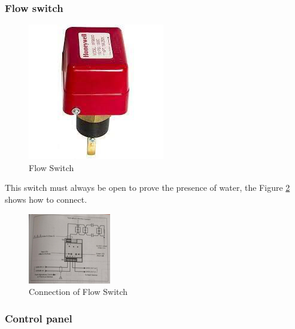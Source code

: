 \documentclass[12pt,fleqn]{book} %
\begin{document}
    \subsubsection{Flow switch}
    \begin{figure}[!h]
    \centering
    \includegraphics[width=0.5\linewidth]{hamdy 42.png}
    \caption{Flow Switch}
    \label{fig:hamdy 42}
\end{figure}
    This switch must always be open to prove the presence of water, the  Figure \ref{fig:hamdy 41} shows how to connect.
    \begin{figure}[!h]
    \centering
    \includegraphics[width=1\linewidth]{hamdy 41.png}
    \caption{Connection of Flow Switch}
    \label{fig:hamdy 41}
    \end{figure}
\subsubsection{Control panel}
\end{document}
